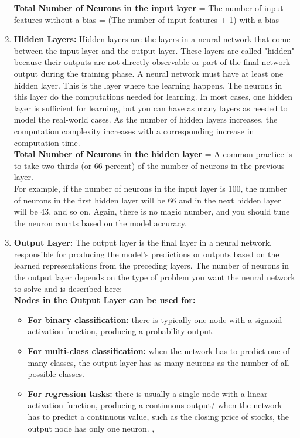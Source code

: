 \begin{enumerate}
    \textbf{Total Number of Neurons in the input layer} = The number of input features without a bias = (The number of input features + 1) with a bias 
    \cite{ansari2020building}\\
    \item \textbf{Hidden Layers: } Hidden layers are the layers in a neural network that come between the input layer and the output layer. These layers are called "hidden" because their outputs are not directly observable or part of the final network output during the training phase. A neural network must have at least one hidden layer. This is the layer where the learning happens. The neurons in this layer do the computations needed for learning. In most cases, one hidden layer is sufficient for learning, but you can have as many layers as needed to model the real-world cases. As the number of hidden layers increases, the computation complexity increases with a corresponding increase in computation time.
    \\
    
    \textbf{Total Number of Neurons in the hidden layer} = A common practice is to take two-thirds (or 66 percent) of the number of neurons in the previous layer.\\
    
    For example, if the number of neurons in the input layer is 100, the number of neurons in the first hidden layer will be 66 and in the next hidden layer will be 43, and so on. Again, there is no magic number, and you should tune the neuron counts based on the model accuracy.
    \item \textbf{Output Layer: } The output layer is the final layer in a neural network, responsible for producing the model's predictions or outputs based on the learned representations from the preceding layers. The number of neurons in the output layer depends on the type of problem you want the neural network to solve and is described here: \\
    \textbf{Nodes in the Output Layer can be used for:}
    \begin{itemize}
        \item \textbf{For binary classification: } there is typically one node with a sigmoid activation function, producing a probability output.\\
        \item \textbf{For multi-class classification: } when the network has to predict one of many classes, the output layer has as many neurons as the number of all possible classes.\\
        \item \textbf{For regression tasks: } there is usually a single node with a linear activation function, producing a continuous output/ when the network has to predict a continuous value, such as the closing price of stocks, the output node has only one neuron. \cite{calin2020deep}, \cite{nielsen2015neural}
    \end{itemize}
\end{enumerate}
